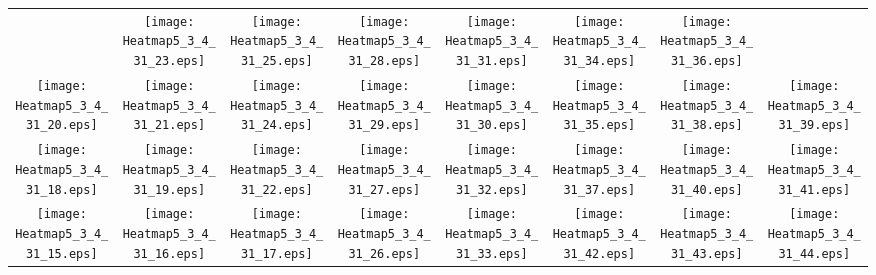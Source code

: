 \documentclass{standalone}
\begin{document}
\renewcommand{\arraystretch}{0}
\setlength{\tabcolsep}{0pt}
\begin{tabular}{ *8{c} }
 & \texttt{[image: Heatmap5\_3\_4\_31\_23.eps]} & \texttt{[image: Heatmap5\_3\_4\_31\_25.eps]} & \texttt{[image: Heatmap5\_3\_4\_31\_28.eps]} & \texttt{[image: Heatmap5\_3\_4\_31\_31.eps]} & \texttt{[image: Heatmap5\_3\_4\_31\_34.eps]} & \texttt{[image: Heatmap5\_3\_4\_31\_36.eps]} &  \\
\texttt{[image: Heatmap5\_3\_4\_31\_20.eps]} & \texttt{[image: Heatmap5\_3\_4\_31\_21.eps]} & \texttt{[image: Heatmap5\_3\_4\_31\_24.eps]} & \texttt{[image: Heatmap5\_3\_4\_31\_29.eps]} & \texttt{[image: Heatmap5\_3\_4\_31\_30.eps]} & \texttt{[image: Heatmap5\_3\_4\_31\_35.eps]} & \texttt{[image: Heatmap5\_3\_4\_31\_38.eps]} & \texttt{[image: Heatmap5\_3\_4\_31\_39.eps]} \\
\texttt{[image: Heatmap5\_3\_4\_31\_18.eps]} & \texttt{[image: Heatmap5\_3\_4\_31\_19.eps]} & \texttt{[image: Heatmap5\_3\_4\_31\_22.eps]} & \texttt{[image: Heatmap5\_3\_4\_31\_27.eps]} & \texttt{[image: Heatmap5\_3\_4\_31\_32.eps]} & \texttt{[image: Heatmap5\_3\_4\_31\_37.eps]} & \texttt{[image: Heatmap5\_3\_4\_31\_40.eps]} & \texttt{[image: Heatmap5\_3\_4\_31\_41.eps]} \\
\texttt{[image: Heatmap5\_3\_4\_31\_15.eps]} & \texttt{[image: Heatmap5\_3\_4\_31\_16.eps]} & \texttt{[image: Heatmap5\_3\_4\_31\_17.eps]} & \texttt{[image: Heatmap5\_3\_4\_31\_26.eps]} & \texttt{[image: Heatmap5\_3\_4\_31\_33.eps]} & \texttt{[image: Heatmap5\_3\_4\_31\_42.eps]} & \texttt{[image: Heatmap5\_3\_4\_31\_43.eps]} & \texttt{[image: Heatmap5\_3\_4\_31\_44.eps]} \\

\end{tabular}
\end{document}
